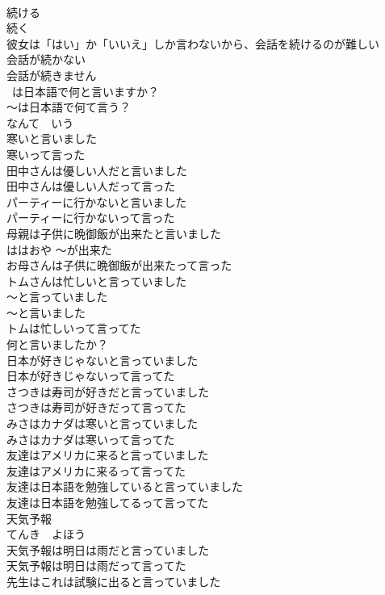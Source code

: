 \documentclass[8pt]{extreport}
\begin{document}
\begin{CJK}{UTF8}{min}
\\	続ける 
\\	続く 
\\	彼女は「はい」か「いいえ」しか言わないから、会話を続けるのが難しい	
\\	会話が続かない	
\\	会話が続きません	
\\	~は日本語で何と言いますか？	
\\	～は日本語で何て言う？	
\\	なんて　いう
\\	寒いと言いました	
\\	寒いって言った	
\\	田中さんは優しい人だと言いました	
\\	田中さんは優しい人だって言った	
\\	パーティーに行かないと言いました	
\\	パーティーに行かないって言った	
\\	母親は子供に晩御飯が出来たと言いました	
\\	ははおや ～が出来た 
\\	お母さんは子供に晩御飯が出来たって言った	
\\	トムさんは忙しいと言っていました	
\\	～と言っていました 
\\	～と言いました 
\\	トムは忙しいって言ってた	
\\	何と言いましたか？	
\\	日本が好きじゃないと言っていました	
\\	日本が好きじゃないって言ってた	
\\	さつきは寿司が好きだと言っていました	
\\	さつきは寿司が好きだって言ってた	
\\	みさはカナダは寒いと言っていました	
\\	みさはカナダは寒いって言ってた	
\\	友達はアメリカに来ると言っていました	
\\	友達はアメリカに来るって言ってた	
\\	友達は日本語を勉強していると言っていました	
\\	友達は日本語を勉強してるって言ってた	
\\	天気予報	
\\	てんき　よほう
\\	天気予報は明日は雨だと言っていました	
\\	天気予報は明日は雨だって言ってた	
\\	先生はこれは試験に出ると言っていました	

\end{CJK}
\end{document}

